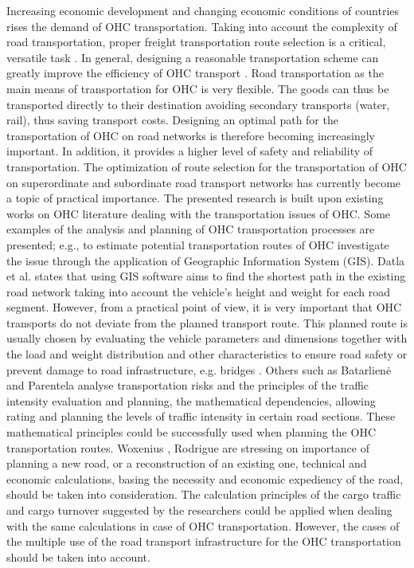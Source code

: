 %

Increasing economic development and changing economic conditions of countries rises the demand of OHC transportation. Taking into account the complexity of road transportation, proper freight transportation route selection is a critical, versatile task \cite{bazaras2013optimal, xu2001methodology, sivilevicius2007dynamics}. In general, designing a reasonable transportation scheme can greatly improve the efficiency of OHC transport \cite{meng2015optimized}. Road transportation as the main means of transportation for OHC is very flexible. The goods can thus be transported directly to their destination avoiding secondary transports (water, rail), thus saving transport costs. Designing an optimal path for the transportation of OHC on road networks is therefore becoming increasingly important. In addition, it provides a higher level of safety and reliability of transportation. The optimization of route selection for the transportation of OHC on superordinate and subordinate road transport networks has currently become a topic of practical importance\cite{geisberger2011efficient}. 
The presented research is built upon existing works on OHC literature dealing with the transportation issues of OHC. Some examples of the analysis and planning of OHC transportation processes are presented; e.g., to estimate potential transportation routes of OHC \cite{durham2002gis} investigate the issue through the application of Geographic Information System (GIS). Datla et al. \cite{datla2004gis} states that using GIS software aims to find the shortest path in the existing road network taking into account the vehicle’s height and weight for each road segment. However, from a practical point of view, it is very important that OHC transports do not deviate from the planned transport route. This planned route is usually chosen by evaluating the vehicle parameters and dimensions together with the load and weight distribution and other characteristics to ensure road safety or prevent damage to road infrastructure, e.g. bridges \cite{ecmt2006improving, vaitkus2016effect, kombe2017modelling, pauer2017development}.
Others such as Batarlienė \cite{batarliene2007mobile} and Parentela \cite{parentela2002risk} analyse transportation risks and the principles of the traffic intensity evaluation and planning, the mathematical dependencies, allowing rating and planning the levels of traffic intensity in certain road sections. These mathematical principles could be successfully used when planning the OHC transportation routes. Woxenius \cite{woxenius2002organisation, woxenius2002conceptual}, Rodrigue \cite{rodrigue2020geography}are stressing on importance of planning a new road, or a reconstruction of an existing one, technical and economic calculations, basing the necessity and economic expediency of the road, should be taken into consideration. The calculation principles of the cargo traffic and cargo turnover suggested by the researchers could be applied when dealing with the same calculations in case of OHC  transportation. However, the cases of the multiple use of the road transport infrastructure for the OHC transportation should be taken into account. 

